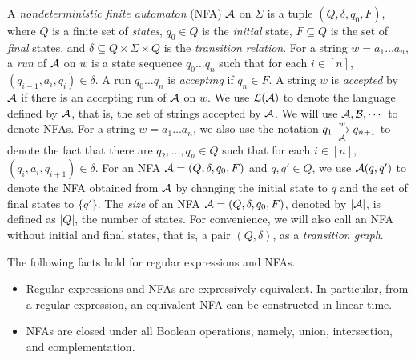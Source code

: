 A \emph{nondeterministic finite automaton} (NFA) $\mathcal{A}$ on $\Sigma$ is a tuple $(Q, \delta, q_0, F)$, where $Q$ is a finite set of \emph{states}, $q_0 \in Q$ is the \emph{initial} state, $F \subseteq Q$ is the set of \emph{final} states, and $\delta \subseteq Q \times \Sigma \times Q$ is the \emph{transition relation}. For a string $w = a_1 \dots a_n$, a \emph{run} of $\mathcal{A}$ on $w$ is a state sequence $q_0 \dots q_n$ such that for each $i \in [n]$, $(q_{i-1}, a_i, q_i) \in \delta$. A run $q_0 \dots q_n$ is \emph{accepting} if $q_n \in F$. A string $w$ is \emph{accepted} by $\mathcal{A}$ if there is an accepting run of $\mathcal{A}$ on $w$. We use $\mathcal{L}(\mathcal{A})$ to denote the language defined by $\mathcal{A}$, that is, the set of strings accepted by $\mathcal{A}$. We will use $\mathcal{A}, \mathcal{B}, \cdots$ to denote NFAs. 
For a string $w= a_1 \dots a_n$, we also use the notation $q_1 \xrightarrow[\mathcal{A}]{w} q_{n+1}$ to denote the fact that there are $q_2,\dots, q_n \in Q$ such that for each $i \in [n]$, $(q_i, a_i, q_{i+1}) \in \delta$.  For an NFA $\mathcal{A}=(Q, \delta, q_0, F)$ and $q, q' \in Q$, we use $\mathcal{A}(q,q')$ to denote the NFA obtained from $\mathcal{A}$ by changing the initial state to $q$ and the set of final states to $\{q'\}$. The \emph{size} of an NFA $\mathcal{A}=(Q, \delta, q_0, F)$, denoted by $|\mathcal{A}|$, is defined as $|Q|$, the number of states. For convenience, we will also call an NFA without initial and final states, that is, a pair $(Q, \delta)$, as a \emph{transition graph}. 


\begin{proposition}[\cite{HU79}]
The following facts hold for regular expressions and NFAs.
\begin{itemize}
\item Regular expressions and NFAs are expressively equivalent. In particular, from a regular expression, an equivalent NFA can be constructed in linear time.  
%
\item NFAs are closed under all Boolean operations, namely, union, intersection, and complementation.
\end{itemize}
\end{proposition}

